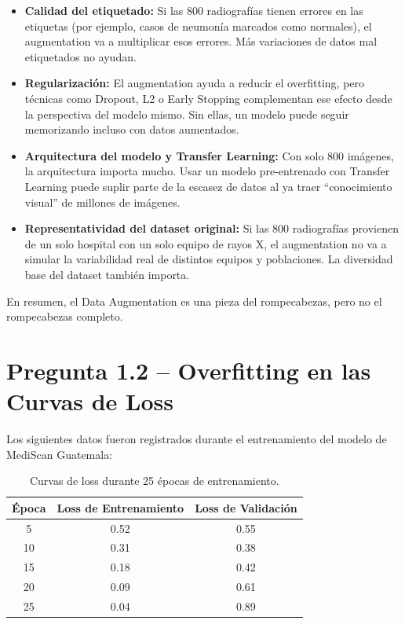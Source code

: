 \documentclass[12pt, letterpaper]{article}
\begin{document}
\begin{itemize}[leftmargin=1.5cm]
    \item \textbf{Calidad del etiquetado:} Si las 800 radiografías tienen errores en las etiquetas
    (por ejemplo, casos de neumonía marcados como normales), el augmentation va a multiplicar esos
    errores. Más variaciones de datos mal etiquetados no ayudan.

    \item \textbf{Regularización:} El augmentation ayuda a reducir el overfitting, pero técnicas
    como Dropout, L2 o Early Stopping complementan ese efecto desde la perspectiva del modelo
    mismo. Sin ellas, un modelo puede seguir memorizando incluso con datos aumentados.

    \item \textbf{Arquitectura del modelo y Transfer Learning:} Con solo 800 imágenes, la
    arquitectura importa mucho. Usar un modelo pre-entrenado con Transfer Learning puede suplir
    parte de la escasez de datos al ya traer ``conocimiento visual'' de millones de imágenes.

    \item \textbf{Representatividad del dataset original:} Si las 800 radiografías provienen de
    un solo hospital con un solo equipo de rayos X, el augmentation no va a simular la variabilidad
    real de distintos equipos y poblaciones. La diversidad base del dataset también importa.
\end{itemize}

En resumen, el Data Augmentation es una pieza del rompecabezas, pero no el rompecabezas completo.

\section{Pregunta 1.2 -- Overfitting en las Curvas de Loss}

Los siguientes datos fueron registrados durante el entrenamiento del modelo de MediScan Guatemala:

\begin{table}[h!]
\centering
\begin{tabular}{ccc}
\toprule
\textbf{Época} & \textbf{Loss de Entrenamiento} & \textbf{Loss de Validación} \\
\midrule
5  & 0.52 & 0.55 \\
10 & 0.31 & 0.38 \\
15 & 0.18 & 0.42 \\
20 & 0.09 & 0.61 \\
25 & 0.04 & 0.89 \\
\bottomrule
\end{tabular}
\caption{Curvas de loss durante 25 épocas de entrenamiento.}
\end{table}
\end{document}
